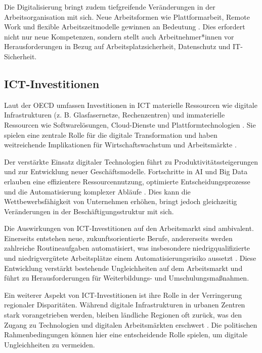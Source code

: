Die Digitalisierung bringt zudem tiefgreifende Veränderungen in der 
Arbeitsorganisation mit sich. Neue Arbeitsformen wie Plattformarbeit, Remote Work und 
flexible Arbeitszeitmodelle gewinnen an Bedeutung 
\parencite[vgl.][S. 58–60]{schwab2016thefourth}.
Dies erfordert nicht nur neue Kompetenzen, sondern stellt auch Arbeitnehmer*innen 
vor Herausforderungen in Bezug auf Arbeitsplatzsicherheit, Datenschutz und 
\ac{IT}-Sicherheit. 


\subsection{ICT-Investitionen}

Laut der OECD umfassen Investitionen in \ac{ICT} materielle Ressourcen wie digitale 
Infrastrukturen (z. B. Glasfasernetze, Rechenzentren) und immaterielle Ressourcen wie 
Softwarelösungen, Cloud-Dienste und Plattformtechnologien \parencite{oecd2022ict}. 
Sie spielen eine zentrale Rolle für die digitale Transformation und haben 
weitreichende Implikationen für Wirtschaftswachstum und Arbeitsmärkte 
\parencite[vgl.][S. 50]{oecd2019measuring}. 

Der verstärkte Einsatz digitaler Technologien führt zu Produktivitätssteigerungen und
zur Entwicklung neuer Geschäftsmodelle. Fortschritte in \ac{AI} und Big Data erlauben
eine effizientere Ressourcennutzung, optimierte Entscheidungsprozesse und die
Automatisierung komplexer Abläufe \parencite[vgl.][S. 120]{oecd2019measuring}. Dies
kann die Wettbewerbsfähigkeit von Unternehmen erhöhen, bringt jedoch gleichzeitig
Veränderungen in der Beschäftigungsstruktur mit sich. 

Die Auswirkungen von \ac{ICT}-Investitionen auf den Arbeitsmarkt sind ambivalent.
Einerseits entstehen neue, zukunftsorientierte Berufe, andererseits werden zahlreiche
Routineaufgaben automatisiert, was insbesondere niedrigqualifizierte und  
niedrigvergütete Arbeitsplätze einem Automatisierungsrisiko aussetzt 
\parencite[vgl.][S. 42]{frey2013thefuture}. Diese Entwicklung verstärkt bestehende 
Ungleichheiten auf dem Arbeitsmarkt und führt zu Herausforderungen für Weiterbildungs- 
und Umschulungsmaßnahmen. 

Ein weiterer Aspekt von \ac{ICT}-Investitionen ist ihre Rolle in der Verringerung
regionaler Disparitäten. Während digitale Infrastrukturen in urbanen Zentren stark
vorangetrieben werden, bleiben ländliche Regionen oft zurück, was den Zugang zu
Technologien und digitalen Arbeitsmärkten erschwert 
\parencite[vgl.][S. 106]{oecd2019measuring}. Die politischen Rahmenbedingungen 
können hier eine entscheidende Rolle spielen, um digitale Ungleichheiten zu vermeiden. 

